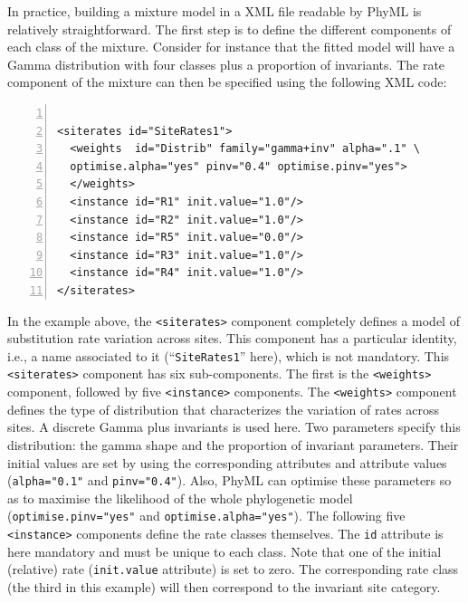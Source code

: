 \documentclass[a4paper,12pt]{article}
\newcommand{\x}[1]{\texttt{#1}}
\begin{document}
In  practice,  building   a  mixture  model  in   a  XML  file  readable  by   PhyML  is  relatively
straightforward.  The first  step  is  to define  the  different components  of  each  class of  the
mixture.  Consider for  instance that  the fitted  model will  have a  Gamma distribution  with four
classes plus  a proportion of invariants.  The rate component of  the mixture can then  be specified
using the following XML code:

\vspace{0.2cm}
\begin{Verbatim}[frame=single, label=$\Gamma4$+I rates, samepage=true, baselinestretch=0.5,
  fontsize=\small, numbers=left]

<siterates id="SiteRates1">
  <weights  id="Distrib" family="gamma+inv" alpha=".1" \
  optimise.alpha="yes" pinv="0.4" optimise.pinv="yes">
  </weights>
  <instance id="R1" init.value="1.0"/>
  <instance id="R2" init.value="1.0"/>
  <instance id="R5" init.value="0.0"/>
  <instance id="R3" init.value="1.0"/>
  <instance id="R4" init.value="1.0"/>
</siterates>

\end{Verbatim}

In the example above, the \x{<siterates>} component  completely defines a model of substitution rate
variation across  sites. This component  has a  particular identity, i.e.,  a name associated  to it
(``\x{SiteRates1}''  here),  which  is  not  mandatory.   This  \x{<siterates>}  component  has  six
sub-components.   The  first  is  the  \x{<weights>}  component,  followed  by  five  \x{<instance>}
components. The  \x{<weights>} component  defines the  type of  distribution that  characterizes the
variation of  rates across sites.  A discrete  Gamma plus invariants  is used here.   Two parameters
specify this distribution: the gamma shape and the proportion of invariant parameters. Their initial
values  are set  by using  the corresponding  attributes and  attribute values  (\x{alpha="0.1"} and
\x{pinv="0.4"}). Also, PhyML can  optimise these parameters so as to maximise  the likelihood of the
whole phylogenetic model (\x{optimise.pinv="yes"}  and \x{optimise.alpha="yes"}). The following five
\x{<instance>}  components  define  the  rate  classes themselves.  The  \x{id}  attribute  is  here
mandatory  and must  be  unique  to each  class.   Note  that one  of  the  initial (relative)  rate
(\x{init.value} attribute) is set to zero. The  corresponding rate class (the third in this example)
will then correspond to the invariant site category.
\end{document}
